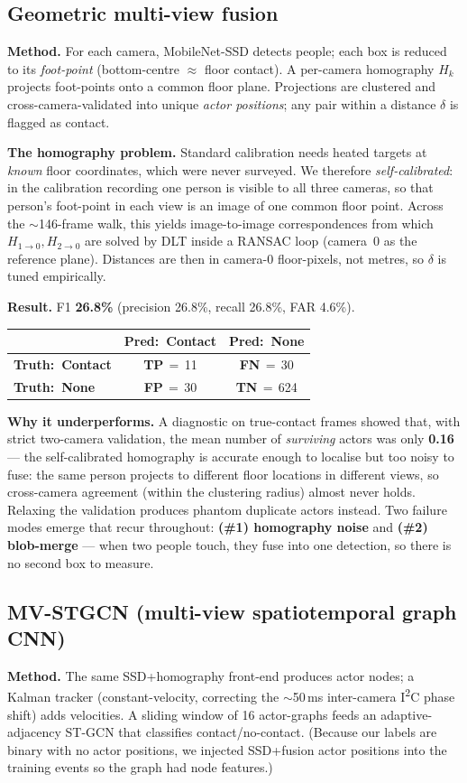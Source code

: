 \documentclass[11pt, a4paper]{article}
\newcommand{\confmat}[6]{%
    \vspace{2pt}\begin{center}\renewcommand{\arraystretch}{1.5}%
    \begin{tabular}{lcc}
        \hline\rule{0pt}{2.2ex}%
        & \textbf{Pred:\ #1} & \textbf{Pred:\ #2} \\[1pt]\hline\rule{0pt}{2.4ex}%
        \textbf{Truth:\ #1}
            & \cellcolor{cellgreenlight}\textcolor{tpgreen}{\textbf{TP}}\,$=$\,#3
            & \cellcolor{cellyellowlight}\textcolor{fnyellow}{\textbf{FN}}\,$=$\,#4 \\[3pt]
        \textbf{Truth:\ #2}
            & \cellcolor{cellredlight}\textcolor{fpred}{\textbf{FP}}\,$=$\,#5
            & \cellcolor{cellbluelight}\textcolor{tnblue}{\textbf{TN}}\,$=$\,#6 \\[1pt]\hline
    \end{tabular}\end{center}\vspace{2pt}}
\begin{document}
\subsection{Geometric multi-view fusion}
\label{sec:geom}
\textbf{Method.} For each camera, MobileNet-SSD detects people; each box is
reduced to its \emph{foot-point} (bottom-centre $\approx$ floor contact). A
per-camera homography $H_k$ projects foot-points onto a common floor plane.
Projections are clustered and cross-camera-validated into unique
\emph{actor positions}; any pair within a distance $\delta$ is flagged as contact.

\textbf{The homography problem.} Standard calibration needs heated targets at
\emph{known} floor coordinates, which were never surveyed. We therefore
\emph{self-calibrated}: in the calibration recording one person is visible to all
three cameras, so that person's foot-point in each view is an image of one common
floor point. Across the $\sim$146-frame walk, this yields image-to-image
correspondences from which $H_{1\to0}, H_{2\to0}$ are solved by DLT inside a
RANSAC loop (camera~0 as the reference plane). Distances are then in camera-0
floor-pixels, not metres, so $\delta$ is tuned empirically.

\textbf{Result.} F1 \textbf{26.8\%} (precision 26.8\%, recall 26.8\%, FAR 4.6\%).

\confmat{Contact}{None}{11}{30}{30}{624}

\textbf{Why it underperforms.} A diagnostic on true-contact frames showed that,
with strict two-camera validation, the mean number of \emph{surviving} actors was
only \textbf{0.16} --- the self-calibrated homography is accurate enough to
localise but too noisy to fuse: the same person projects to different floor
locations in different views, so cross-camera agreement (within the clustering
radius) almost never holds. Relaxing the validation produces phantom duplicate
actors instead. Two failure modes emerge that recur throughout:
\textbf{(\#1) homography noise} and \textbf{(\#2) blob-merge} --- when two people
touch, they fuse into one detection, so there is no second box to measure.

\subsection{MV-STGCN (multi-view spatiotemporal graph CNN)}
\label{sec:stgcn}
\textbf{Method.} The same SSD+homography front-end produces actor nodes; a Kalman
tracker (constant-velocity, correcting the $\sim$50\,ms inter-camera I\textsuperscript{2}C
phase shift) adds velocities. A sliding window of 16 actor-graphs feeds an
adaptive-adjacency ST-GCN that classifies contact/no-contact. (Because our labels
are binary with no actor positions, we injected SSD+fusion actor positions into
the training events so the graph had node features.)
\end{document}
